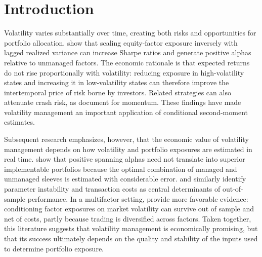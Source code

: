 \documentclass[preprint,12pt,authoryear]{elsarticle}
\begin{document}
\section{Introduction}
\label{sec:introduction}

Volatility varies substantially over time, creating both risks and opportunities for portfolio allocation. \citet{moreiramuir2017} show that scaling equity-factor exposure inversely with lagged realized variance can increase Sharpe ratios and generate positive alphas relative to unmanaged factors. The economic rationale is that expected returns do not rise proportionally with volatility: reducing exposure in high-volatility states and increasing it in low-volatility states can therefore improve the intertemporal price of risk borne by investors. Related strategies can also attenuate crash risk, as \citet{barrososantaclara2015} document for momentum. These findings have made volatility management an important application of conditional second-moment estimates.

Subsequent research emphasizes, however, that the economic value of volatility management depends on how volatility and portfolio exposures are estimated in real time. \citet{cederburg2020} show that positive spanning alphas need not translate into superior implementable portfolios because the optimal combination of managed and unmanaged sleeves is estimated with considerable error. \citet{barrosodetzel2021} and \citet{schwarz2025} similarly identify parameter instability and transaction costs as central determinants of out-of-sample performance. In a multifactor setting, \citet{demiguelmartinutrerauppal2024} provide more favorable evidence: conditioning factor exposures on market volatility can survive out of sample and net of costs, partly because trading is diversified across factors. Taken together, this literature suggests that volatility management is economically promising, but that its success ultimately depends on the quality and stability of the inputs used to determine portfolio exposure.
\end{document}
